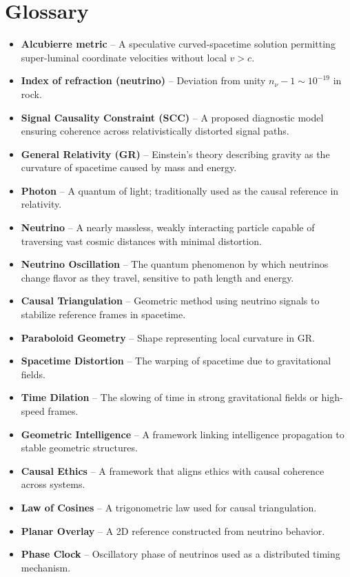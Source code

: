 \documentclass[12pt]{article}
\begin{document}
\section*{Glossary}
\begin{itemize}
\item \textbf{Alcubierre metric} – A speculative curved-spacetime solution permitting super-luminal coordinate velocities without local $v > c$.
\item \textbf{Index of refraction (neutrino)} – Deviation from unity $n_\nu - 1 \sim 10^{-19}$ in rock.
\item \textbf{Signal Causality Constraint (SCC)} – A proposed diagnostic model ensuring coherence across relativistically distorted signal paths.
\item \textbf{General Relativity (GR)} – Einstein’s theory describing gravity as the curvature of spacetime caused by mass and energy.
\item \textbf{Photon} – A quantum of light; traditionally used as the causal reference in relativity.
\item \textbf{Neutrino} – A nearly massless, weakly interacting particle capable of traversing vast cosmic distances with minimal distortion.
\item \textbf{Neutrino Oscillation} – The quantum phenomenon by which neutrinos change flavor as they travel, sensitive to path length and energy.
\item \textbf{Causal Triangulation} – Geometric method using neutrino signals to stabilize reference frames in spacetime.
\item \textbf{Paraboloid Geometry} – Shape representing local curvature in GR.
\item \textbf{Spacetime Distortion} – The warping of spacetime due to gravitational fields.
\item \textbf{Time Dilation} – The slowing of time in strong gravitational fields or high-speed frames.
\item \textbf{Geometric Intelligence} – A framework linking intelligence propagation to stable geometric structures.
\item \textbf{Causal Ethics} – A framework that aligns ethics with causal coherence across systems.
\item \textbf{Law of Cosines} – A trigonometric law used for causal triangulation.
\item \textbf{Planar Overlay} – A 2D reference constructed from neutrino behavior.
\item \textbf{Phase Clock} – Oscillatory phase of neutrinos used as a distributed timing mechanism.

\end{itemize}
\end{document}
